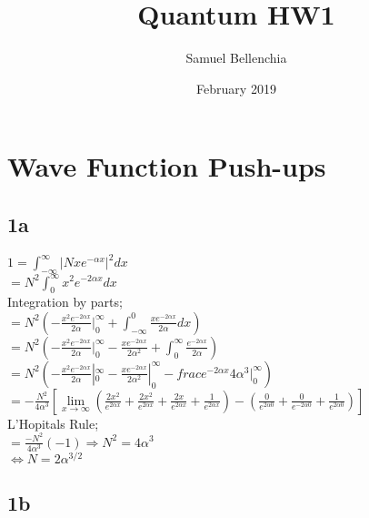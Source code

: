 \documentclass{article}
\title{Quantum HW1}
\author{Samuel Bellenchia}
\date{February 2019}
\begin{document}
\maketitle

\section*{Wave Function Push-ups}
\subsection*{1a}


$1={\displaystyle \int_{-\infty}^{\infty} }|Nxe^{-\alpha x}|^2dx$\\

$=N^2{\displaystyle \int_{0}^{\infty} }x^2e^{-2\alpha x}dx$\\

Integration by parts;\\

$=N^2(-\frac{x^2e^{-2\alpha x}}{2\alpha}|_0^{\infty}+\int_{-\infty}^{0}\frac{xe^{-2\alpha x}}{2\alpha}dx) $ \\

$=N^2(-\frac{x^2e^{-2\alpha x}}{2\alpha}|_0^{\infty}-\frac{xe^{-2\alpha x}}{2\alpha^2}+\int_{0}^{\infty}\frac{e^{-2\alpha x}}{2\alpha}) $ \\

$=N^2(-\frac{x^2e^{-2\alpha x}}{2\alpha}|_0^{\infty}-\frac{xe^{-2\alpha x}}{2\alpha^2}|_0^{\infty}-frac{e^{-2\alpha x}}{4\alpha^3}|_0^{\infty}) $ \\

$=-\frac{N^2}{4\alpha^3}[\lim\limits_{x\rightarrow\infty}(\frac{2x^2}{e^{2\alpha x}}+\frac{2x^2}{e^{2\alpha x}}+\frac{2x}{e^{2\alpha x}}+\frac{1}{e^{2\alpha x}})-(\frac{0}{e^{2\alpha 0}}+\frac{0}{e^{-2\alpha 0}}+\frac{1}{e^{2\alpha 0}})]$\\

L'Hopitals Rule;\\

$=\frac{-N^2}{4\alpha^3}(-1)\Rightarrow N^2=4\alpha^3$\\

$\Leftrightarrow N=2\alpha^{3/2}$\\

\subsection*{1b}
\end{document}
